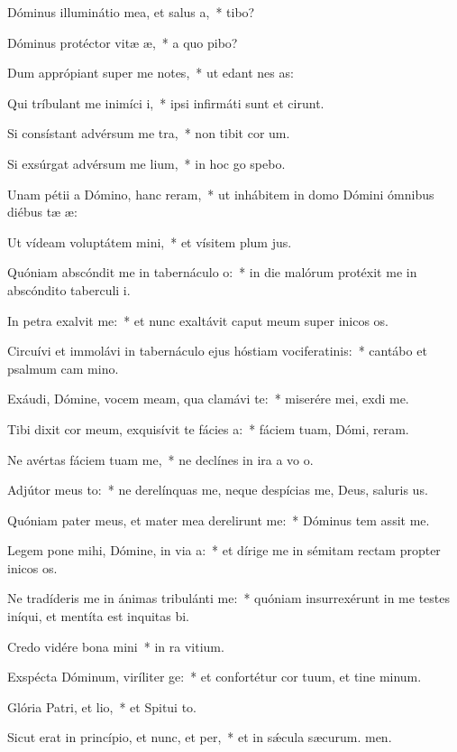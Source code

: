 \item Dóminus illuminátio mea, et salus a,~*  tibo?
\item Dóminus protéctor vitæ æ,~* a quo pibo?
\item Dum apprópiant super me notes,~* ut edant nes as:
\item Qui tríbulant me inimíci i,~* ipsi infirmáti sunt et cirunt.
\item Si consístant advérsum me tra,~* non tibit cor um.
\item Si exsúrgat advérsum me lium,~* in hoc go spebo.
\item Unam pétii a Dómino, hanc reram,~* ut inhábitem in domo Dómini ómnibus diébus tæ æ:
\item Ut vídeam voluptátem mini,~* et vísitem plum jus.
\item Quóniam abscóndit me in tabernáculo o:~* in die malórum protéxit me in abscóndito taberculi i.
\item In petra exalvit me:~* et nunc exaltávit caput meum super inicos os.
\item Circuívi et immolávi in tabernáculo ejus hóstiam vociferatinis:~* cantábo et psalmum cam mino.
\item Exáudi, Dómine, vocem meam, qua clamávi  te:~* miserére mei,  exdi me.
\item Tibi dixit cor meum, exquisívit te fácies a:~* fáciem tuam, Dómi, reram.
\item Ne avértas fáciem tuam  me,~* ne declínes in ira a vo o.
\item Adjútor meus to:~* ne derelínquas me, neque despícias me, Deus, saluris us.
\item Quóniam pater meus, et mater mea derelirunt me:~* Dóminus tem assit me.
\item Legem pone mihi, Dómine, in via a:~* et dírige me in sémitam rectam propter inicos os.
\item Ne tradíderis me in ánimas tribulánti me:~* quóniam insurrexérunt in me testes iníqui, et mentíta est inquitas bi.
\item Credo vidére bona mini~* in ra vitium.
\item Exspécta Dóminum, viríliter ge:~* et confortétur cor tuum, et tine minum.
\item Glória Patri, et lio,~* et Spitui to.
\item Sicut erat in princípio, et nunc, et per,~* et in sǽcula sæcurum. men.
